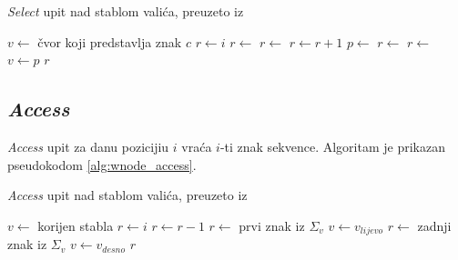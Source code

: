 \begin{algorithm}[H]
  \caption{\emph{Select} upit nad stablom valića, preuzeto iz \cite{breberic}}
  \begin{algorithmic}[1]
    \State $v \gets $ čvor koji predstavlja znak $c$
    \State $r \gets i$
      \State $r \gets $ 
    \Else
      \State $r \gets $ 
    \EndIf
      \State $r \gets r + 1$
      \State $p \gets $ 
        \State $r \gets $ 
      \Else
        \State $r \gets $ 
      \EndIf
      \State $v \gets p$ 
    \EndWhile \State{}
    \Return $r$
    \EndFunction
  \end{algorithmic}
  \label{alg:wnode_select}
\end{algorithm}

\subsection{\emph{Access}}

\emph{Access} upit za danu pozicijiu $i$ vraća $i$-ti znak sekvence. Algoritam je prikazan pseudokodom \ref{alg:wnode_access}.

\begin{algorithm}[H]
  \caption{\emph{Access} upit nad stablom valića, preuzeto iz \cite{breberic}}
  \begin{algorithmic}[1]
    \State $v \gets $ korijen stabla
    \State $r \gets i$
       \State $r \gets r - 1$ \EndIf
        \State $r \gets $ 
         \Return prvi znak iz $\Sigma_v$ \EndIf
        \State $v \gets v_{lijevo}$
      \Else
        \State $r \gets $ 
         \Return zadnji znak iz $\Sigma_v$ \EndIf
        \State $v \gets v_{desno}$
      \EndIf
    \EndWhile\State{}
    \Return $r$
    \EndFunction
  \end{algorithmic}
  \label{alg:wnode_access}
\end{algorithm}
